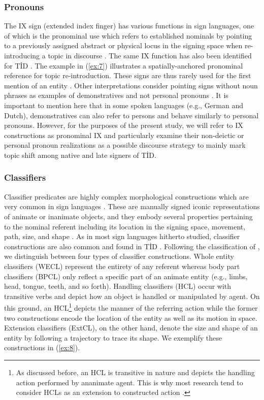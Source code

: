 \documentclass[review]{elsarticle} %
\begin{document}
\hypertarget{pronouns}{%
\subsubsection{Pronouns}\label{pronouns}}

The IX sign (extended index finger) has various functions in sign
languages, one of which is the pronominal use which refers to
established nominals by pointing to a previously assigned abstract or
physical locus in the signing space when re-introducing a topic in
discourse \citep{emmorey1996}. The same IX function has also been
identified for TİD \citep{sevinc2006}. The example in (\ref{ex:7})
illustrates a spatially-anchored pronominal reference for topic
re-introduction. These signs are thus rarely used for the first mention
of an entity \citep{perniss2015}. Other interpretations consider
pointing signs without noun phrases as examples of demonstratives and
not personal pronouns \citep{koulidobrova2016}. It is important to
mention here that in some spoken languages (e.g., German and Dutch),
demonstratives can also refer to persons \citep{bosch2007} and behave
similarly to personal pronouns. However, for the purposes of the present
study, we will refer to IX constructions as pronominal IX and
particularly examine their non-deictic or personal pronoun realizations
as a possible discourse strategy to mainly mark topic shift among native
and late signers of TİD.

\hypertarget{classifiers}{%
\subsubsection{Classifiers}\label{classifiers}}

Classifier predicates are highly complex morphological constructions
which are very common in sign languages \citep{supalla1986}. These are
manually signed iconic representations of animate or inanimate objects,
and they embody several properties pertaining to the nominal referent
including its location in the signing space, movement, path, size, and
shape \citep{talmy2003}. As in most sign languages hitherto studied,
classifier constructions are also common and found in TİD \citep[see][
for a review]{dikyuva2015}. Following the classification of
\citet{engberg-pedersen1993}, we distinguish between four types of
classifier constructions. Whole entity classifiers (WECL) represent the
entirety of any referent whereas body part classifiers (BPCL) only
reflect a specific part of an animate entity (e.g., limbs, head, tongue,
teeth, and so forth). Handling classifiers (HCL) occur with transitive
verbs and depict how an object is handled or manipulated by agent. On
this ground, an HCL\footnote{As discussed before, an HCL is transitive
  in nature and depicts the handling action performed by ananimate
  agent. This is why most research tend to consider HCLs as an extension
  to constructed action \citep{dudis2004, cormier2013}.} depicts the
manner of the referring action while the former two constructions encode
the location of the entity as well as its motion in space. Extension
classifiers (ExtCL), on the other hand, denote the size and shape of an
entity by following a trajectory to trace its shape. We exemplify these
constructions in (\ref{ex:8}).
\end{document}
